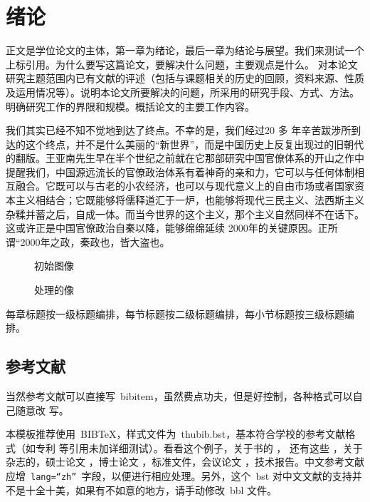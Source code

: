 \section{绪论}
正文是学位论文的主体，第一章为绪论，最后一章为结论与展望。我们来测试一个上标引用。为什么要写这篇论文，要解决什么问题，主要观点是什么。 对本论文研究主题范围内已有文献的评述（包括与课题相关的历史的回顾，资料来源、性质及运用情况等）。说明本论文所要解决的问题，所采用的研究手段、方式、方法。明确研究工作的界限和规模。概括论文的主要工作内容。

我们其实已经不知不觉地到达了终点。不幸的是，我们经过20 多
年辛苦跋涉所到达的这个终点，并不是什么美丽的“新世界”，而是中国历史上反复出现过的旧朝代的翻版。王亚南先生早在半个世纪之前就在它那部研究中国官僚体系的开山之作中提醒我们，中国源远流长的官僚政治体系有着神奇的亲和力，它可以与任何体制相互融合。它既可以与古老的小农经济，也可以与现代意义上的自由市场或者国家资本主义相结合；它既能够将儒释道汇于一炉，也能够将现代三民主义、法西斯主义杂糅并蓄之后，自成一体。而当今世界的这个主义，那个主义自然同样不在话下。这或许正是中国官僚政治自秦以降，能够绵绵延续
2000年的关键原因。正所谓“2000年之政，秦政也，皆大盗也。
\begin{figure}[H]
\centering
\subfigure[原始图像]{\label{figure:001} \texttt{[image: 001]}}
\subfigure[噪声图像（$\mu=0,\sigma=20$)]{\label{figure:002} \texttt{[image: 002]}}
\caption{初始图像}
\end{figure}

\begin{figure}[H]
\centering
\subfigure[$\lambda=\frac{1}{20^2}$]{\label{figure:1/20}
 \texttt{[image: 003]}}
\subfigure[$\lambda=\frac{5}{20^2}$]{\label{figure:5/20} \texttt{[image: 004]}}
\subfigure[$\lambda=\frac{10}{20^2}$]{\label{figure:10/20} \texttt{[image: 005]}}
\subfigure[$\lambda=\frac{20}{20^2}$]{\label{figure:20/20} \texttt{[image: 006]}}
\caption{处理的像}
\end{figure}   

    每章标题按一级标题编排，每节标题按二级标题编排，每小节标题按三级标题编排。
    
\subsection{参考文献}
\label{sec:bib}
当然参考文献可以直接写~bibitem，虽然费点功夫，但是好控制，各种格式可以自己随意改
写。

本模板推荐使用~BIB\TeX，样式文件为~thubib.bst，基本符合学校的参考文献格式（如专利
等引用未加详细测试）。看看这个例子，关于书的
\cite{tex, companion, ColdSources}，
还有这些 \cite{Krasnogor2004e, clzs, zjsw}，关于杂志的\cite{ELIDRISSI94,
  MELLINGER96, SHELL02}，硕士论文 \cite{zhubajie, metamori2004}，博士论文 \cite{shaheshang, FistSystem01}，标准文件\cite{IEEE-1363}，会议论文 \cite{DPMG,kocher99}，技术报告\cite{NPB2}。中文参考文献\cite{cnarticle}应增~\texttt{lang=``zh''}~字段，以便进行相应处理。另外，这个~bst 对中文文献\cite{cnproceed}的支持并不是十全十美，如果有不如意的地方，请手动修改~bbl 文件。

